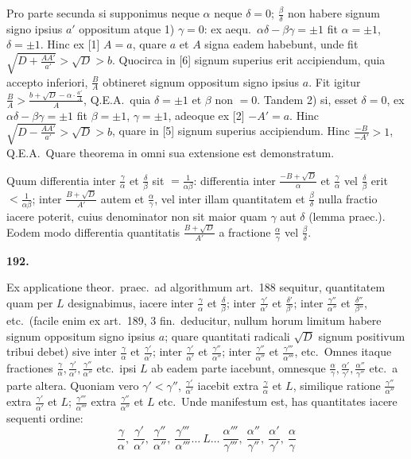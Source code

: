 \documentclass[12pt,a4paper]{article}
\theoremstyle{plain}
\theoremstyle{definition}
\theoremstyle{remark}
\newcommand{\qeoa}{\textsc{Q.E.A.}}
\begin{document}
Pro parte secunda si supponimus neque $\alpha$ neque $\delta=0$; $\frac{\beta}{\delta}$ non habere signum signo ipsius $a'$ oppositum atque 1) $\gamma=0$: ex aequ.\ $\alpha\delta-\beta\gamma=\pm 1$ fit $\alpha=\pm 1$, $\delta=\pm 1$. Hinc ex [1] $A=a$, quare $a$ et $A$ signa eadem habebunt, unde fit $\sqrt{D+\frac{AA'}{a'}}>\sqrt{D}>b$. Quocirca in [6] signum superius erit accipiendum, quia accepto inferiori, $\frac{B}{A}$ obtineret signum oppositum signo ipsius $a$. Fit igitur $\frac{B}{A}>\frac{b+\sqrt{D}-\alpha\cdot\frac{a'}{A}}{A}$, \qeoa\, quia $\delta=\pm 1$ et $\beta$ non $=0$. Tandem 2) si, esset $\delta=0$, ex $\alpha\delta-\beta\gamma=\pm 1$ fit $\beta=\pm 1$, $\gamma=\pm 1$, adeoque ex [2] $-A'=a$. Hinc $\sqrt{D-\frac{AA'}{a'}}>\sqrt{D}>b$, quare in [5] signum superius accipiendum. Hinc $\frac{-B}{-A'}>1$, \qeoa\ Quare theorema in omni sua extensione est demonstratum.

Quum differentia inter $\frac{\gamma}{\alpha}$ et $\frac{\delta}{\beta}$ sit $=\frac{1}{\alpha\beta}$: differentia inter $\frac{-B+\sqrt{D}}{\alpha}$ et $\frac{\gamma}{\alpha}$ vel $\frac{\delta}{\beta}$ erit $<\frac{1}{\alpha\beta}$; inter $\frac{B+\sqrt{D}}{A'}$ autem et $\frac{\alpha}{\gamma}$, vel inter illam quantitatem et $\frac{\beta}{\delta}$ nulla fractio iacere poterit, cuius denominator non sit maior quam $\gamma$ aut $\delta$ (lemma praec.). Eodem modo differentia quantitatis $\frac{B+\sqrt{D}}{A'}$ a fractione $\frac{\alpha}{\gamma}$ vel $\frac{\beta}{\delta}$.

\textbf{192.}

Ex applicatione theor.\ praec.\ ad algorithmum art.\ 188 sequitur, quantitatem quam per $L$ designabimus, iacere inter $\frac{\gamma}{\alpha}$ et $\frac{\delta}{\beta}$; inter $\frac{\gamma'}{\alpha'}$ et $\frac{\delta'}{\beta'}$; inter $\frac{\gamma''}{\alpha''}$ et $\frac{\delta''}{\beta''}$, etc.\ (facile enim ex art.\ 189, 3 fin.\ deducitur, nullum horum limitum habere signum oppositum signo ipsius $a$; quare quantitati radicali $\sqrt{D}$ signum positivum tribui debet) sive inter $\frac{\gamma}{\alpha}$ et $\frac{\gamma'}{\alpha'}$; inter $\frac{\gamma'}{\alpha'}$ et $\frac{\gamma''}{\alpha''}$; inter $\frac{\gamma''}{\alpha''}$ et $\frac{\gamma'''}{\alpha'''}$, etc.\ Omnes itaque fractiones $\frac{\gamma}{\alpha},\frac{\gamma'}{\alpha'},\frac{\gamma''}{\alpha''}$ etc.\ ipsi $L$ ab eadem parte iacebunt, omnesque $\frac{\alpha}{\gamma},\frac{\alpha'}{\gamma'},\frac{\alpha''}{\gamma''}$ etc.\ a parte altera. Quoniam vero $\gamma'<\gamma''$, $\frac{\gamma'}{\alpha'}$ iacebit extra $\frac{\gamma}{\alpha}$ et $L$, similique ratione $\frac{\gamma''}{\alpha''}$ extra $\frac{\gamma'}{\alpha'}$ et $L$; $\frac{\gamma'''}{\alpha'''}$ extra $\frac{\gamma''}{\alpha''}$ et $L$ etc.\ Unde manifestum est, has quantitates iacere sequenti ordine:
\[\frac{\gamma}{\alpha},\ \frac{\gamma'}{\alpha'},\ \frac{\gamma''}{\alpha''},\ \frac{\gamma'''}{\alpha'''}\ldots\ L\ldots\ \frac{\alpha'''}{\gamma'''},\ \frac{\alpha''}{\gamma''},\ \frac{\alpha'}{\gamma'},\ \frac{\alpha}{\gamma}\]
\end{document}
